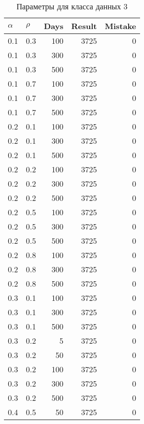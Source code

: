 \begin{center}
	\captionsetup{justification=raggedright,singlelinecheck=off}
	\begin{longtable}[c]{|r|r|r|r|r|}
		\caption{Параметры для класса данных 3 \label{tbl:cls3}}\\
		\hline
		\multicolumn{1}{|l|}{$\alpha$} &
		\multicolumn{1}{l|}{$\rho$} & 
		\multicolumn{1}{l|}{Days} & 
		\multicolumn{1}{l|}{Result} & 
		\multicolumn{1}{l|}{Mistake} \\ \hline
		0.1 &  0.3 &  100 & 3725 &     0 \\
		0.1 &  0.3 &  300 & 3725 &     0 \\
		0.1 &  0.3 &  500 & 3725 &     0 \\ \hline
		0.1 &  0.7 &  100 & 3725 &     0 \\
		0.1 &  0.7 &  300 & 3725 &     0 \\
		0.1 &  0.7 &  500 & 3725 &     0 \\ \hline
		0.2 &  0.1 &  100 & 3725 &     0 \\
		0.2 &  0.1 &  300 & 3725 &     0 \\
		0.2 &  0.1 &  500 & 3725 &     0 \\ \hline
		0.2 &  0.2 &  100 & 3725 &     0 \\
		0.2 &  0.2 &  300 & 3725 &     0 \\
		0.2 &  0.2 &  500 & 3725 &     0 \\ \hline
		0.2 &  0.5 &  100 & 3725 &     0 \\
		0.2 &  0.5 &  300 & 3725 &     0 \\
		0.2 &  0.5 &  500 & 3725 &     0 \\ \hline
		0.2 &  0.8 &  100 & 3725 &     0 \\
		0.2 &  0.8 &  300 & 3725 &     0 \\
		0.2 &  0.8 &  500 & 3725 &     0 \\ \hline
		0.3 &  0.1 &  100 & 3725 &     0 \\
		0.3 &  0.1 &  300 & 3725 &     0 \\
		0.3 &  0.1 &  500 & 3725 &     0 \\ \hline
		0.3 &  0.2 &    5 & 3725 &     0 \\
		0.3 &  0.2 &   50 & 3725 &     0 \\
		0.3 &  0.2 &  100 & 3725 &     0 \\
		0.3 &  0.2 &  300 & 3725 &     0 \\
		0.3 &  0.2 &  500 & 3725 &     0 \\ \hline
		0.4 &  0.5 &   50 & 3725 &     0 \\

\end{longtable}
\end{center}

